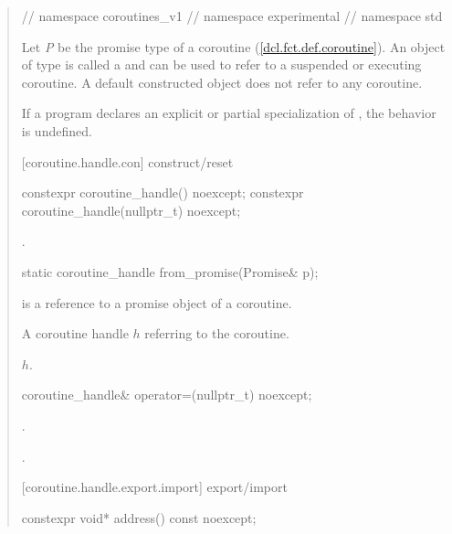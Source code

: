 \begin{quote}
\begin{codeblock}
{{{} // namespace coroutines_v1
} // namespace experimental
} // namespace std
\end{codeblock}

\pnum
Let \textit{P} be the promise type of a coroutine (\ref{dcl.fct.def.coroutine}). An object of type  is called a 
and can be used to refer to a suspended or executing coroutine.
A default constructed  object does not refer to any coroutine.

\pnum If a program declares an explicit or partial specialization of , the behavior is undefined.



[coroutine.handle.con]{ construct/reset}
\begin{itemdecl}
  constexpr coroutine_handle() noexcept;		
  constexpr coroutine_handle(nullptr_t) noexcept;
\end{itemdecl}
\begin{itemdescr}
  \pnum\postconditions {}.
\end{itemdescr}

\begin{itemdecl}
  static coroutine_handle from_promise(Promise& p);
\end{itemdecl}
\begin{itemdescr}
  \pnum
  \precondition {} is a reference to a promise object of a coroutine.
  
	\pnum
  \returns A coroutine handle $h$ referring to the coroutine.
  
  \pnum\postconditions {}$h$.
\end{itemdescr}

\begin{itemdecl}
  coroutine_handle& operator=(nullptr_t) noexcept;
\end{itemdecl}
\begin{itemdescr}
	\pnum\postconditions {}.
  
  \pnum\returns {}.
\end{itemdescr}

[coroutine.handle.export.import]{ export/import}

\begin{itemdecl}
  constexpr void* address() const noexcept;
\end{itemdecl}


\end{quote}
